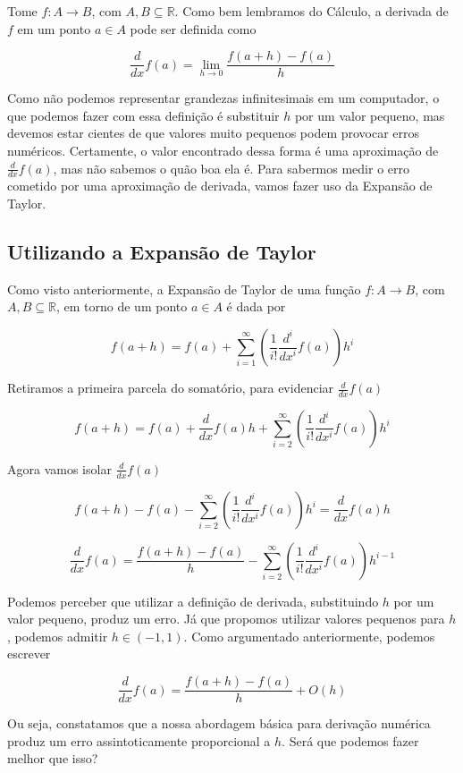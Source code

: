 \documentclass[]{article}
\numberwithin{equation}{section}
\begin{document}
Tome $f : A \to B$, com $A, B \subseteq \mathbb{R}$. Como bem lembramos do Cálculo, a derivada de $f$ em um ponto $a \in A$ pode ser definida como

$$
\frac{d}{dx} f(a) = \lim_{h \to 0} \frac{f(a + h) - f(a)}{h}
$$

Como não podemos representar grandezas infinitesimais em um computador, o que podemos fazer com essa definição é substituir $h$ por um valor pequeno, mas devemos estar cientes de que valores muito pequenos podem provocar erros numéricos. Certamente, o valor encontrado dessa forma é uma aproximação de $\frac{d}{dx} f(a)$, mas não sabemos o quão boa ela é. Para sabermos medir o erro cometido por uma aproximação de derivada, vamos fazer uso da Expansão de Taylor.

\subsection{Utilizando a Expansão de Taylor}

Como visto anteriormente, a Expansão de Taylor de uma função $f : A \to B$, com $A, B \subseteq \mathbb{R}$, em torno de um ponto $a \in A$ é dada por

$$
f(a + h) = f(a) + \sum_{i = 1}^{\infty} \left(\frac{1}{i!} \frac{d^i}{dx^i} f(a)\right) h^i
$$

Retiramos a primeira parcela do somatório, para evidenciar $\frac{d}{dx} f(a)$

$$
f(a + h) = f(a) + \frac{d}{dx} f(a)h + \sum_{i = 2}^{\infty} \left(\frac{1}{i!} \frac{d^i}{dx^i} f(a)\right) h^i
$$

Agora vamos isolar $\frac{d}{dx} f(a)$

$$
f(a + h) - f(a) - \sum_{i = 2}^{\infty} \left(\frac{1}{i!} \frac{d^i}{dx^i} f(a)\right) h^i = \frac{d}{dx} f(a)h
$$

$$
\frac{d}{dx} f(a) = \frac{f(a + h) - f(a)}{h} - \sum_{i = 2}^{\infty} \left(\frac{1}{i!} \frac{d^i}{dx^i} f(a)\right) h^{i - 1}
$$

Podemos perceber que utilizar a definição de derivada, substituindo $h$ por um valor pequeno, produz um erro. Já que propomos utilizar valores pequenos para $h$, podemos admitir $h \in (-1, 1)$. Como argumentado anteriormente, podemos escrever

$$
\frac{d}{dx} f(a) = \frac{f(a + h) - f(a)}{h} + O(h)
$$

Ou seja, constatamos que a nossa abordagem básica para derivação numérica produz um erro assintoticamente proporcional a $h$. Será que podemos fazer melhor que isso?
\end{document}
